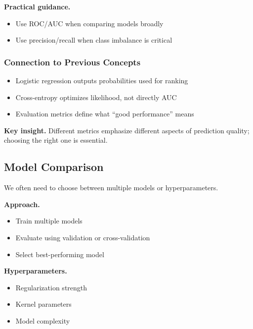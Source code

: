 \medskip

\noindent
\textbf{Practical guidance.}

\begin{itemize}
    \item Use ROC/AUC when comparing models broadly
    \item Use precision/recall when class imbalance is critical
\end{itemize}

\subsubsection{Connection to Previous Concepts}

\begin{itemize}
    \item Logistic regression outputs probabilities used for ranking
    \item Cross-entropy optimizes likelihood, not directly AUC
    \item Evaluation metrics define what ``good performance'' means
\end{itemize}

\medskip

\noindent
\textbf{Key insight.}  
Different metrics emphasize different aspects of prediction quality; choosing the right one is essential.

\subsection{Model Comparison}

We often need to choose between multiple models or hyperparameters.

\medskip

\noindent
\textbf{Approach.}
\begin{itemize}
    \item Train multiple models
    \item Evaluate using validation or cross-validation
    \item Select best-performing model
\end{itemize}

\medskip

\noindent
\textbf{Hyperparameters.}
\begin{itemize}
    \item Regularization strength
    \item Kernel parameters
    \item Model complexity
\end{itemize}

